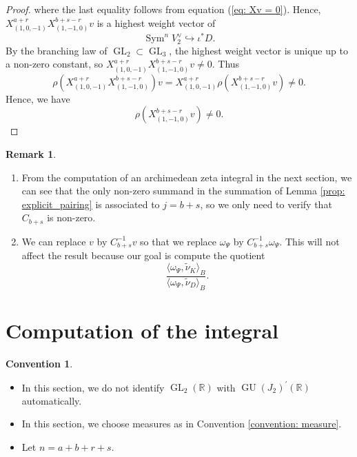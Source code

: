 \documentclass[11pt, a4paper]{amsart}
\theoremstyle{plain}
\theoremstyle{definition}
\newtheorem{remark}[theorem]{Remark}
\newtheorem{convention}[theorem]{Convention}
\numberwithin{equation}{section}
\def\RR{\mathbb{R}}
\DeclareMathOperator{\Sym}{Sym}
\DeclareMathOperator{\GU}{GU}
\DeclareMathOperator{\GL}{\mathrm{GL}}
\begin{document}
\begin{proof}
    where the last equality follows from equation (\ref{eq: Xv = 0}).
    Hence, $X^{a + r}_{(1, 0, -1)}X^{b + s - r}_{(1, -1, 0)}v$ is a highest weight vector of 
    \begin{equation*}
        \Sym^{n}V_{2}^{\vee}  \hookrightarrow \iota^{*}D . 
    \end{equation*}
    By the branching law of $\GL_2 \subset \GL_3$, the highest weight vector is unique up to a non-zero constant, so $X^{a + r}_{(1, 0, -1)}X^{b + s - r}_{(1, -1, 0)}v \neq 0$. Thus
    \begin{equation*}
        \rho(X^{a + r}_{(1, 0, -1)}X^{b + s - r}_{(1, -1, 0)})v = X^{a + r}_{(1, 0, -1)} \rho(X^{b + s - r}_{(1, -1, 0)}v) \neq 0. 
    \end{equation*}
    Hence, we have 
    \begin{equation*}
        \rho(X^{b + s - r}_{(1, -1, 0)}v) \neq 0. 
    \end{equation*}
\end{proof}

\begin{remark}
    \begin{enumerate}
        \item From the computation of an archimedean zeta integral in the next section, we can see that the only non-zero summand in the summation of Lemma \ref{prop: explicit_pairing} is associated to $j = b + s$, so we only need to verify that $C_{b + s}$ is non-zero. 
        \item We can replace $v$ by $C_{b + s}^{-1}v$ so that we replace $\omega_{\Psi}$ by $C_{b + s}^{-1}\omega_{\Psi}$. This will not affect the result because our goal is compute the quotient 
        \begin{equation*}
            \frac{\langle \omega_{\Psi}, \tilde{\nu}_{K} \rangle_{B}}{\langle \omega_{\Psi},  \tilde{\nu}_{D} \rangle_{B}}. 
        \end{equation*}
    \end{enumerate}
\end{remark}


\section{Computation of the integral}
\label{Sec: zeta integral}

\begin{convention}
    \begin{itemize}
        \item In this section, we do not identify $\GL_2(\RR)$ with $\GU(J_2)^{\prime}(\RR)$ automatically. 
        \item In this section, we choose measures as in Convention \ref{convention: measure}. 
        \item Let $n = a + b + r + s$.
    \end{itemize}
\end{convention}
\end{document}
